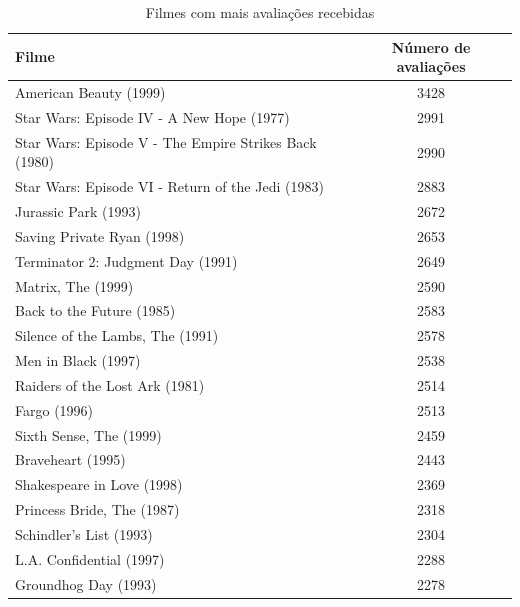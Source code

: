 \documentclass[12pt,a4paper,header]{abnt}
\begin{document}
\begin{table}[h]
\caption{Filmes com mais avaliações recebidas}
\label{top20_filmes}
\begin{tabular}{@{}lc@{}}
\toprule
\textbf{Filme}                                                 & \textbf{Número de avaliações} \\ \midrule
American Beauty (1999)                                & 3428    \\
Star Wars: Episode IV - A New Hope (1977)             & 2991    \\
Star Wars: Episode V - The Empire Strikes Back (1980) & 2990    \\
Star Wars: Episode VI - Return of the Jedi (1983)     & 2883    \\
Jurassic Park (1993)                                  & 2672    \\
Saving Private Ryan (1998)                            & 2653    \\
Terminator 2: Judgment Day (1991)                     & 2649    \\
Matrix, The (1999)                                    & 2590    \\
Back to the Future (1985)                             & 2583    \\
Silence of the Lambs, The (1991)                      & 2578    \\
Men in Black (1997)                                   & 2538    \\
Raiders of the Lost Ark (1981)                        & 2514    \\
Fargo (1996)                                          & 2513    \\
Sixth Sense, The (1999)                               & 2459    \\
Braveheart (1995)                                     & 2443    \\
Shakespeare in Love (1998)                            & 2369    \\
Princess Bride, The (1987)                            & 2318    \\
Schindler's List (1993)                               & 2304    \\
L.A. Confidential (1997)                              & 2288    \\
Groundhog Day (1993)                                  & 2278    \\ \bottomrule
\end{tabular}
\end{table}
\end{document}
